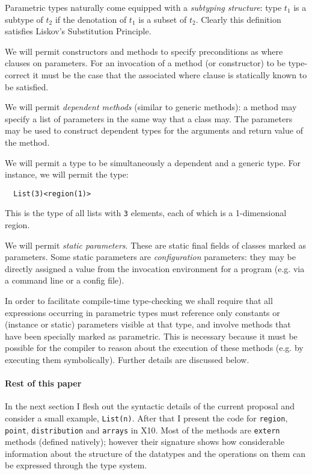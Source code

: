 \documentclass[fullpage]{article}
\def\Xten{{\sf X10}}
\begin{document}
Parametric types naturally come equipped with a {\em subtyping structure}:
type $t_1$ is a subtype of $t_2$ if the denotation of $t_1$ is a
subset of $t_2$. Clearly this definition satisfies Liskov's
Substitution Principle.

We will permit constructors and methods to specify preconditions as
where clauses on parameters. For an invocation of a method (or
constructor) to be type-correct it must be the case that the
associated where clause is statically known to be satisfied.

We will permit {\em dependent methods} (similar to generic methods): a
method may specify a list of parameters in the same way that a class
may. The parameters may be used to construct dependent types for the
arguments and return value of the method.

We will permit a type to be simultaneously a dependent and a generic type.
For instance, we will permit the type:
{\footnotesize
\begin{verbatim}
  List(3)<region(1)>  
\end{verbatim}}
\noindent This is the type of all lists with {\tt 3} elements, each of
which is a 1-dimensional region.

We will permit {\em static parameters}. These are static final fields
of classes marked as parameters. Some static parameters are {\em
configuration} parameters: they may be directly assigned a value from
the invocation environment for a program (e.g.{} via  a command line or
a config file).

In order to facilitate compile-time type-checking we shall require
that all expressions occurring in parametric types must reference only
constants or (instance or static) parameters visible at that type, and
involve methods that have been specially marked as parametric. This is
necessary because it must be possible for the compiler to reason about
the execution of these methods (e.g.{} by executing them
symbolically). Further details are discussed below.

\paragraph{Rest of this paper}
In the next section I flesh out the syntactic details of the current
proposal and consider a small example, {\tt List(n)}. After that I
present the code for {\tt region}, {\tt point}, {\tt distribution} and
{\tt arrays} in \Xten. Most of the methods are {\tt extern} methods
(defined natively); however their signature shows how considerable
information about the structure of the datatypes and the operations on
them can be expressed through the type system.
\end{document}

